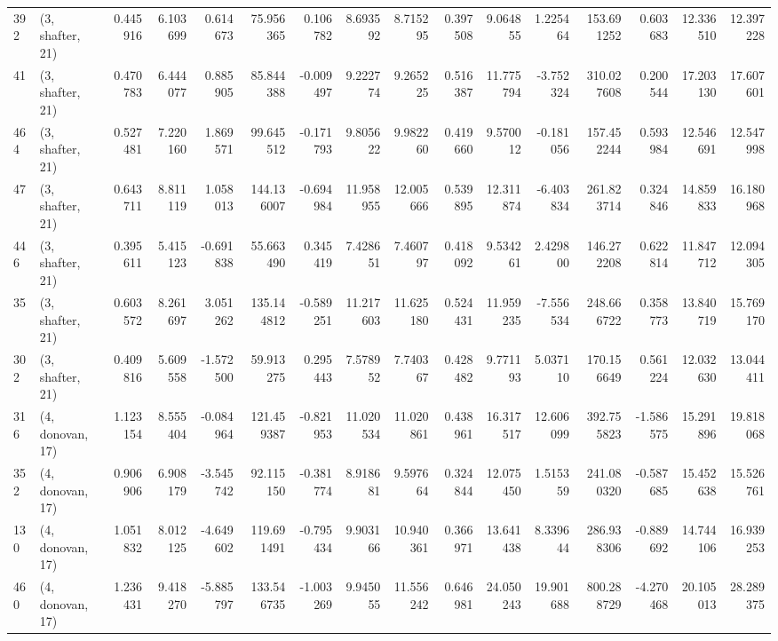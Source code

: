 \begin{tabular}{llrrrrrrrrrrrrrr}
392 &  (3, shafter, 21) &   0.445916 &   6.103699 &   0.614673 &    75.956365 &   0.106782 &   8.693592 &   8.715295 &  0.397508 &   9.064855 &   1.225464 &    153.691252 &    0.603683 &   12.336510 &   12.397228 \\
41  &  (3, shafter, 21) &   0.470783 &   6.444077 &   0.885905 &    85.844388 &  -0.009497 &   9.222774 &   9.265225 &  0.516387 &  11.775794 &  -3.752324 &    310.027608 &    0.200544 &   17.203130 &   17.607601 \\
464 &  (3, shafter, 21) &   0.527481 &   7.220160 &   1.869571 &    99.645512 &  -0.171793 &   9.805622 &   9.982260 &  0.419660 &   9.570012 &  -0.181056 &    157.452244 &    0.593984 &   12.546691 &   12.547998 \\
47  &  (3, shafter, 21) &   0.643711 &   8.811119 &   1.058013 &   144.136007 &  -0.694984 &  11.958955 &  12.005666 &  0.539895 &  12.311874 &  -6.403834 &    261.823714 &    0.324846 &   14.859833 &   16.180968 \\
446 &  (3, shafter, 21) &   0.395611 &   5.415123 &  -0.691838 &    55.663490 &   0.345419 &   7.428651 &   7.460797 &  0.418092 &   9.534261 &   2.429800 &    146.272208 &    0.622814 &   11.847712 &   12.094305 \\
35  &  (3, shafter, 21) &   0.603572 &   8.261697 &   3.051262 &   135.144812 &  -0.589251 &  11.217603 &  11.625180 &  0.524431 &  11.959235 &  -7.556534 &    248.666722 &    0.358773 &   13.840719 &   15.769170 \\
302 &  (3, shafter, 21) &   0.409816 &   5.609558 &  -1.572500 &    59.913275 &   0.295443 &   7.578952 &   7.740367 &  0.428482 &   9.771193 &   5.037110 &    170.156649 &    0.561224 &   12.032630 &   13.044411 \\
316 &  (4, donovan, 17) &   1.123154 &   8.555404 &  -0.084964 &   121.459387 &  -0.821953 &  11.020534 &  11.020861 &  0.438961 &  16.317517 &  12.606099 &    392.755823 &   -1.586575 &   15.291896 &   19.818068 \\
352 &  (4, donovan, 17) &   0.906906 &   6.908179 &  -3.545742 &    92.115150 &  -0.381774 &   8.918681 &   9.597664 &  0.324844 &  12.075450 &   1.515359 &    241.080320 &   -0.587685 &   15.452638 &   15.526761 \\
130 &  (4, donovan, 17) &   1.051832 &   8.012125 &  -4.649602 &   119.691491 &  -0.795434 &   9.903166 &  10.940361 &  0.366971 &  13.641438 &   8.339644 &    286.938306 &   -0.889692 &   14.744106 &   16.939253 \\
460 &  (4, donovan, 17) &   1.236431 &   9.418270 &  -5.885797 &   133.546735 &  -1.003269 &   9.945055 &  11.556242 &  0.646981 &  24.050243 &  19.901688 &    800.288729 &   -4.270468 &   20.105013 &   28.289375 \\

\end{tabular}
